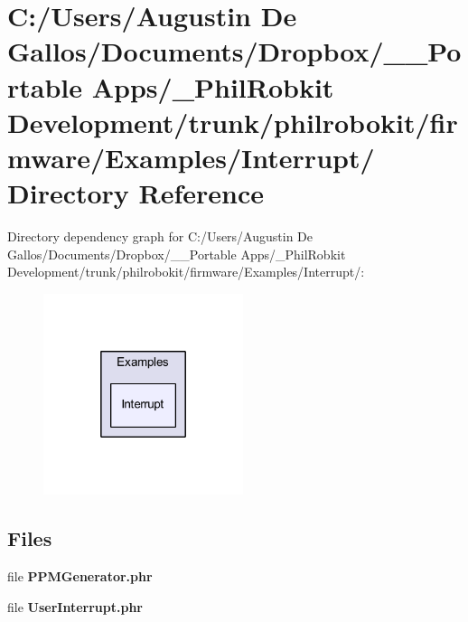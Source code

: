 \section{C\-:/\-Users/\-Augustin De Gallos/\-Documents/\-Dropbox/\-\_\-\-\_\-\-Portable Apps/\-\_\-\-Phil\-Robkit Development/trunk/philrobokit/firmware/\-Examples/\-Interrupt/ Directory Reference}
\label{dir_6005bf70291ba1f07274f051432d9b1c}
Directory dependency graph for C\-:/\-Users/\-Augustin De Gallos/\-Documents/\-Dropbox/\-\_\-\-\_\-\-Portable Apps/\-\_\-\-Phil\-Robkit Development/trunk/philrobokit/firmware/\-Examples/\-Interrupt/\-:\nopagebreak
\begin{figure}[H]
\begin{center}
\leavevmode
\includegraphics[width=166pt]{dir_6005bf70291ba1f07274f051432d9b1c_dep}
\end{center}
\end{figure}
\subsection*{Files}
\begin{DoxyCompactItemize}
\item 
file {\bf P\-P\-M\-Generator.\-phr}
\item 
file {\bf User\-Interrupt.\-phr}
\end{DoxyCompactItemize}

